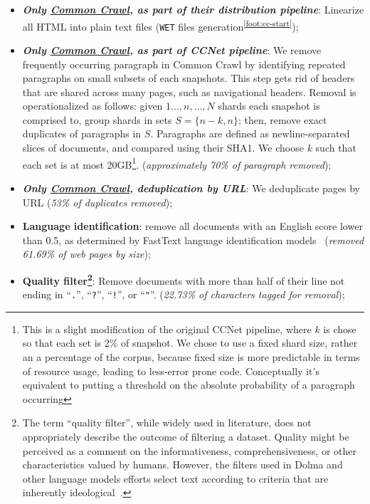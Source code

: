 \documentclass{article}
\newcommand{\dolma}{Dolma\xspace}
\newcommand*{\fnref}[1]{\textsuperscript{\ref{#1}}}
\begin{document}
\begin{itemize}[leftmargin=1em]
    \item \textbf{\textit{Only \underline{Common Crawl}, as part of their distribution pipeline}}: Linearize all HTML into plain text files (\texttt{WET} files generation\fnref{foot:cc-start});
    \item \textbf{\textit{Only \underline{Common Crawl}, as part of CCNet pipeline}}: We remove frequently occurring paragraph in Common Crawl by identifying repeated paragraphs on small subsets of each snapshots. This step gets rid of headers that are shared across many pages, such as navigational headers. 
    Removal is operationalized as follows: given $1\ldots,n,\ldots,N$ shards each snapshot is comprised to, group shards in sets $S=\{n-k, n\}$; then, remove exact duplicates of paragraphs in $S$. Paragraphs are defined as newline-separated slices of documents, and compared using their SHA1. We choose $k$ such that each set is at most 20GB\footnote{This is a slight modification of the original CCNet pipeline, where $k$ is chose so that each set is 2\% of snapshot. We chose to use a fixed shard size, rather an a percentage of the corpus, because fixed size is more predictable in terms of resource usage, leading to less-error prone code. Conceptually it’s equivalent to putting a threshold on the absolute probability of a paragraph occurring}. (\textit{approximately 70\% of paragraph removed});
    \item \textbf{\textit{Only \underline{Common Crawl}, deduplication by URL}}: We deduplicate pages by URL (\textit{53\% of duplicates removed});
    \item \textbf{Language identification}: remove all documents with an English score lower than 0.5, as determined by FastText language identification models~\citep{joulin2016fasttext,joulin2016bag} (\textit{removed 61.69\% of web pages by size});
    \item \textbf{Quality filter\footnote{\label{foot:quality}The term ``quality filter'', while widely used in literature, does not appropriately describe the outcome of filtering a dataset. Quality might be perceived as a comment on the informativeness, comprehensiveness, or other characteristics valued by humans. However, the filters used in \dolma and other language models efforts select text according to criteria that are inherently ideological~\citep{gururangan-etal-2022-whose}.}}: Remove documents with more than half of their line not ending in ``\texttt{.}'', ``\texttt{?}'', ``\texttt{!}'', or ``\texttt{"}''. (\textit{22.73\% of characters tagged for removal});

\end{itemize}
\end{document}
